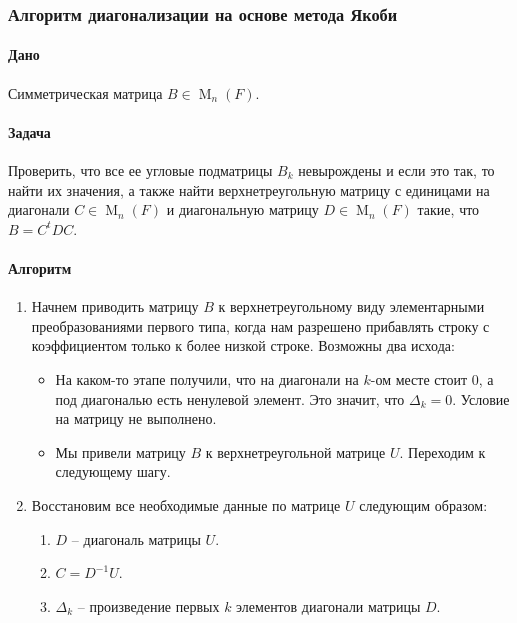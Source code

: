 \subsubsection*{Алгоритм диагонализации на основе метода Якоби}

\paragraph{Дано}

Симметрическая матрица $B\in \operatorname{M}_n(F)$.

\paragraph{Задача}

Проверить, что все ее угловые подматрицы $B_k$ невырождены и если это так, то найти их значения, а также найти верхнетреугольную матрицу с единицами на диагонали $C\in \operatorname{M}_n(F)$ и диагональную матрицу $D\in\operatorname{M}_n(F)$ такие, что $B = C^t D C$.

\paragraph{Алгоритм}

\begin{enumerate}
\item Начнем приводить матрицу $B$ к верхнетреугольному виду элементарными преобразованиями первого типа, когда нам разрешено прибавлять строку с коэффициентом только к более низкой строке.
Возможны два исхода:
\begin{itemize}
\item На каком-то этапе получили, что на диагонали на $k$-ом месте стоит $0$, а под диагональю есть ненулевой элемент.
Это значит, что $\Delta_k = 0$.
Условие на матрицу не выполнено.

\item Мы привели матрицу $B$ к верхнетреугольной матрице $U$.
Переходим к следующему шагу.
\end{itemize}

\item Восстановим все необходимые данные по матрице $U$ следующим образом:
\begin{enumerate}
\item $D$ -- диагональ матрицы $U$.

\item $C =  D^{-1}U$.

\item $\Delta_k$ -- произведение первых $k$ элементов диагонали матрицы $D$.
\end{enumerate}
\end{enumerate}

